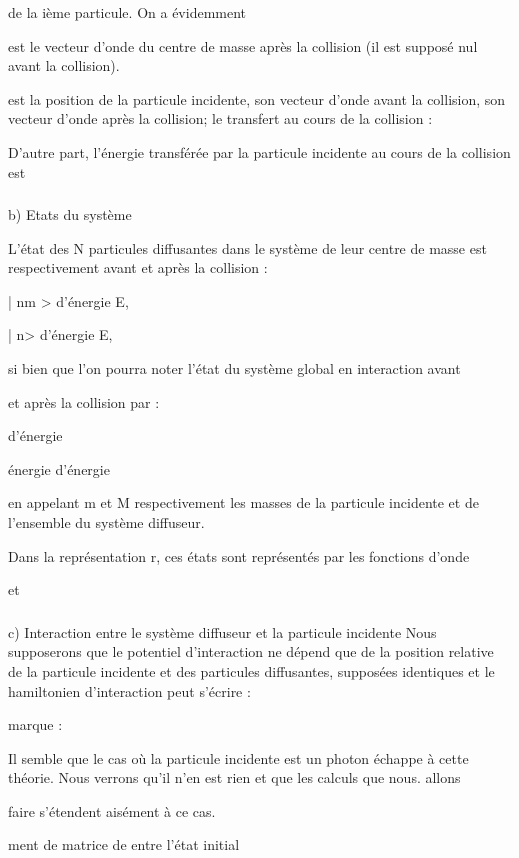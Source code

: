de la ième particule. On a évidemment

 est le vecteur d'onde du centre de masse après la collision (il est supposé
nul avant la collision).

 est la position de la particule incidente,  son vecteur d'onde avant la
collision,  son vecteur d'onde après la collision;  le transfert au cours de
la collision :

D'autre part, l'énergie transférée par la particule incidente au cours de la
collision est

\subsubsection{}%
b) Etats du système

L'état des N particules diffusantes dans le système de leur centre
de masse est respectivement avant et après la collision :

| nm > d'énergie E,

| n> d'énergie E,


si bien que l'on pourra noter l'état du système global en interaction avant

et après la collision par :

d'énergie

énergie
 d'énergie

en appelant m et M respectivement les masses de la particule incidente et de
l'ensemble du système diffuseur.

Dans la représentation r, ces états sont représentés par les
fonctions d'onde

et

\subsubsection{}%
c) Interaction entre le système diffuseur et la particule incidente
Nous supposerons que le potentiel d'interaction ne dépend que
de la position relative de la particule incidente et des particules diffusantes,
supposées identiques et le hamiltonien d'interaction peut s'écrire :

marque :

Il semble que le cas où la particule incidente est un photon échappe à cette
théorie. Nous verrons qu’il n'en est rien et que les calculs que nous. allons

faire s'étendent aisément à ce cas.

ment de matrice  de  entre l'état initial

